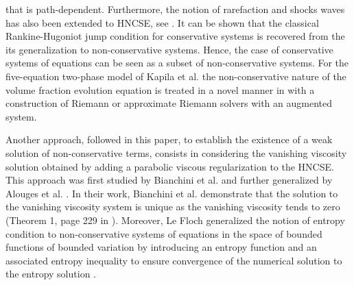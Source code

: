 that is path-dependent. Furthermore, the notion of rarefaction and shocks waves has also been extended to HNCSE,
see \cite{lefloch_liu_1993}. It can be shown that the classical Rankine-Hugoniot jump condition for conservative systems \cite{Lax} is recovered from the 
its generalization to non-conservative systems. Hence, the case of conservative systems of equations can be seen as 
a subset of non-conservative systems. For the five-equation two-phase model of Kapila et al. \cite{Kapila_2001} the non-conservative nature 
of the volume fraction evolution equation is treated in a novel manner in \cite{Berry_2009,Saurel_2009} with a construction of Riemann or 
approximate Riemann solvers with an augmented system.

Another approach, followed in this paper, to establish the existence of a weak solution of non-conservative terms,
consists in considering the vanishing viscosity solution obtained by adding a parabolic viscous regularization to the HNCSE.
This approach was first studied by Bianchini et al. \cite{bianchini_bressan_2005} and 
further generalized by Alouges et al. \cite{alouges_merlet_2004}. In their work, Bianchini et al. demonstrate that the solution to the 
vanishing viscosity system is unique as the vanishing viscosity tends to zero (Theorem 1, page 229 in \cite{bianchini_bressan_2005}). 
Moreover, Le Floch generalized the notion of entropy condition to non-conservative systems of equations in the space of 
bounded functions of bounded variation  by introducing an entropy function and an associated entropy inequality to ensure convergence of the 
numerical solution to the entropy solution \cite{lefloch_1988}.

